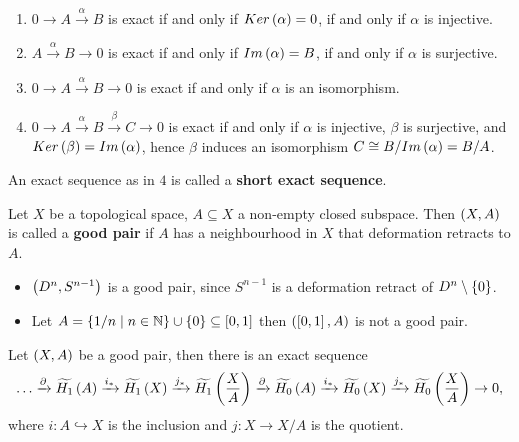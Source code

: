 \begin{example*}
\hfill
\begin{enumerate}
\item $ 0 \to A \xrightarrow{\alpha} B $ is exact if and only if $ Ker\left( \alpha \right) = 0 $, if and only if $ \alpha $ is injective.
\item $ A \xrightarrow{\alpha} B \to 0 $ is exact if and only if $ Im\left( \alpha \right) = B $, if and only if $ \alpha $ is surjective.
\item $ 0 \to A \xrightarrow{\alpha} B \to 0 $ is exact if and only if $ \alpha $ is an isomorphism.
\item $ 0 \to A \xrightarrow{\alpha} B \xrightarrow{\beta} C \to 0 $ is exact if and only if $ \alpha $ is injective, $ \beta $ is surjective, and $ Ker\left( \beta \right) = Im\left( \alpha \right) $, hence $ \beta $ induces an isomorphism $ C \cong B / Im\left( \alpha \right) = B / A $.
\end{enumerate}
\end{example*}

An exact sequence as in $ 4 $ is called a \textbf{short exact sequence}.

\begin{definition*}
Let $ X $ be a topological space, $ A \subseteq X $ a non-empty closed subspace. Then $ \left( X, A \right) $ is called a \textbf{good pair} if $ A $ has a neighbourhood in $ X $ that deformation retracts to $ A $.
\end{definition*}

\begin{example*}
\hfill
\begin{itemize}
\item $ \left( D^n, S^{n - 1} \right) $ is a good pair, since $ S^{n - 1} $ is a deformation retract of $ D^n \setminus \left\{ 0 \right\} $.
\item Let $ A = \left\{ 1 / n \mid n \in \mathbb{N} \right\} \cup \left\{ 0 \right\} \subseteq \left[ 0, 1 \right] $ then $ \left( \left[ 0, 1 \right], A \right) $ is not a good pair.
\end{itemize}
\end{example*}

\begin{theorem}
Let $ \left( X, A \right) $ be a good pair, then there is an exact sequence
$$ \dots \xrightarrow{\partial} \widetilde{H_1}\left( A \right) \xrightarrow{i_*} \widetilde{H_1}\left( X \right) \xrightarrow{j_*} \widetilde{H_1}\left( \dfrac{X}{A} \right) \xrightarrow{\partial} \widetilde{H_0}\left( A \right) \xrightarrow{i_*} \widetilde{H_0}\left( X \right) \xrightarrow{j_*} \widetilde{H_0}\left( \dfrac{X}{A} \right) \to 0, $$
where $ i : A \hookrightarrow X $ is the inclusion and $ j : X \to X / A $ is the quotient.
\end{theorem}

